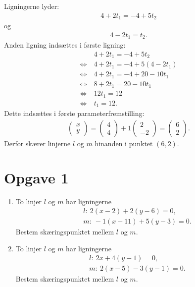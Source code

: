 \begin{exa}
	Ligningerne lyder:
	\begin{align*}
		4 + 2t_1 = -4+5t_2
	\end{align*} og
	\begin{align*}
		4-2t_1 = t_2.
	\end{align*}
	Anden ligning indsættes i første ligning:
	\begin{align*}
		&4 + 2t_1 = -4+5t_2\\
		\Leftrightarrow \ &4 + 2t_1 = -4+5(4-2t_1)\\
		\Leftrightarrow \ &4+2t_1 = -4+20-10t_1\\
		\Leftrightarrow \ &8+2t_1 = 20-10t_1\\
		\Leftrightarrow \ &12t_1 = 12\\
		\Leftrightarrow \ &t_1 = 12.
	\end{align*}
	Dette indsættes i første parameterfremstilling:
	\begin{align*}
		\begin{pmatrix}
			x \\ y
		\end{pmatrix} = 
		\begin{pmatrix}
			4 \\ 4 
		\end{pmatrix} 
		+ 1
		\begin{pmatrix}
			2 \\ -2
		\end{pmatrix} = 
		\begin{pmatrix}
			6 \\ 2
		\end{pmatrix}.
	\end{align*}
	Derfor skærer linjerne $l$ og $m$ hinanden i punktet $(6,2)$. 
\end{exa}

\section*{Opgave 1}
\begin{enumerate}[label=\roman*)]
	\item To linjer $l$ og $m$ har ligningerne
	\begin{align*}
		&l: \ 2(x-2) + 2(y-6) = 0,\\
		&m: \ -1(x-11) + 5(y-3) = 0.
	\end{align*}
	Bestem skæringspunktet mellem $l$ og $m$. 
	\item To linjer $l$ og $m$ har ligningerne 
	\begin{align*}
		&l: \ 2x + 4(y-1) = 0,\\
		&m: \ 2(x-5) -3(y-1) = 0.
	\end{align*}
	Bestem skæringspunktet mellem $l$ og $m$.
\end{enumerate}


